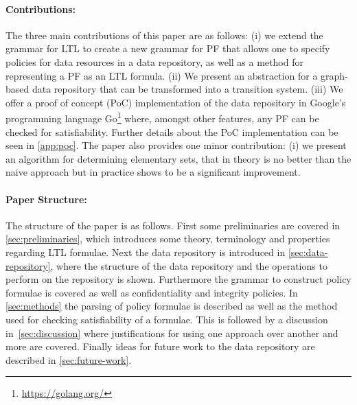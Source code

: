 \paragraph{Contributions:} The three main contributions of this paper are as follows: (i) we extend the grammar for LTL to create a new grammar for PF that allows one to specify policies for data resources in a data repository, as well as a method for representing a PF as an LTL formula. (ii) We present an abstraction for a graph-based data repository that can be transformed into a transition system. (iii) We offer a proof of concept (PoC) implementation of the data repository in Google's programming language Go\footnote{\url{https://golang.org/}} where, amongst other features, any PF can be checked for satisfiability. Further details about the PoC implementation can be seen in \autoref{app:poc}. The paper also provides one minor contribution: (i) we present an algorithm for determining elementary sets, that in theory is no better than the naive approach but in practice shows to be a significant improvement.

\paragraph{Paper Structure:}
The structure of the paper is as follows. First some preliminaries are covered in \autoref{sec:preliminaries}, which introduces some theory, terminology and properties regarding LTL formulae. Next the data repository is introduced in \autoref{sec:data-repository}, where the structure of the data repository and the operations to perform on the repository is shown. Furthermore the grammar to construct policy formulae is covered as well as confidentiality and integrity policies. In \autoref{sec:methods} the parsing of policy formulae is described as well as the method used for checking satisfiability of a formulae. This is followed by a discussion in~\autoref{sec:discussion} where justifications for using one approach over another and more are covered. Finally ideas for future work to the data repository are described in \autoref{sec:future-work}.